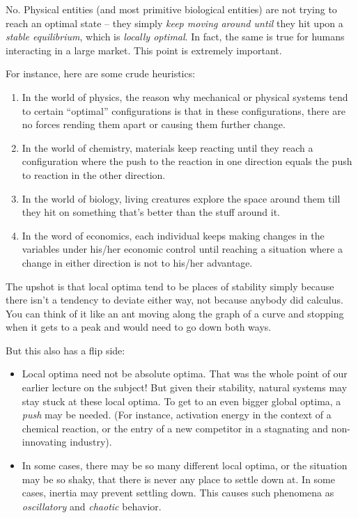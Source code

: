 \documentclass[10pt]{amsart}
\begin{document}
No. Physical entities (and most primitive biological entities) are not
trying to reach an optimal state -- they simply {\em keep moving
around until} they hit upon a {\em stable equilibrium}, which is
{\em locally optimal}. In fact, the same is true for humans interacting in a
large market. This point is extremely important.

For instance, here are some crude heuristics:

\begin{enumerate}
\item In the world of physics, the reason why mechanical or
  physical systems tend to certain ``optimal'' configurations is that in
  these configurations, there are no forces rending them apart or
  causing them further change.
\item In the world of chemistry, materials keep reacting until they
  reach a configuration where the push to the reaction in one direction
  equals the push to reaction in the other direction.
\item In the world of biology, living creatures explore the space
  around them till they hit on something that's better than the stuff
  around it.
\item In the word of economics, each individual keeps making changes
  in the variables under his/her economic control until reaching a
  situation where a change in either direction is not to his/her
  advantage.
\end{enumerate}

The upshot is that local optima tend to be places of stability simply
because there isn't a tendency to deviate either way, not because
anybody did calculus. You can think of it like an ant moving along the
graph of a curve and stopping when it gets to a peak and would need to
go down both ways.

But this also has a flip side:

\begin{itemize}
\item Local optima need not be absolute optima. That was the whole
  point of our earlier lecture on the subject! But given their
  stability, natural systems may stay stuck at these local optima. To
  get to an even bigger global optima, a {\em push} may be
  needed. (For instance, activation energy in the context of a
  chemical reaction, or the entry of a new competitor in a stagnating
  and non-innovating industry).
\item In some cases, there may be so many different local optima, or
  the situation may be so shaky, that there is never any place to
  settle down at. In some cases, inertia may prevent settling
  down. This causes such phenomena as {\em oscillatory} and {\em
  chaotic} behavior.
\end{itemize}
\end{document}
